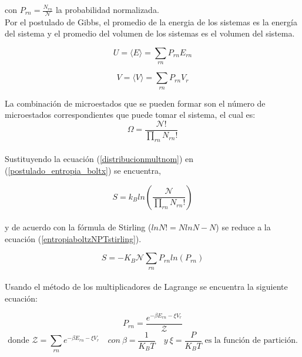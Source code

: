 con $P_{rn} = \frac{N_{rn}}{\mathcal{N}}$ la probabilidad normalizada.\\

Por el postulado de Gibbs, el promedio de la energia de los sistemas es la energía del sistema y el promedio del volumen de los sistemas es el volumen del sistema.

\begin{equation} \label{energiaprobNPT}
    U = \langle E\rangle = \sum_{rn} P_{rn} E_{rn}
\end{equation}

\begin{equation} \label{volprobNPT}
    V = \langle V\rangle = \sum_{rn} P_{rn} V_r
\end{equation}

La combinación de microestados que se pueden formar son el número de microestados correspondientes que puede tomar el sistema, el cual es:\\

\begin{equation} \label{distribucionmultnom}
    \Omega = \frac{\mathcal{N}!}{\prod_{rn} N_{rn}!}
\end{equation}\\

Sustituyendo la ecuación (\ref{distribucionmultnom}) en (\ref{postulado_entropia_boltx}) se encuentra,

\begin{equation}  \label{entropiaboltzNPT}
    S = k_{B}ln\left(\frac{\mathcal{N}}{\prod_{rn} N_{rn}!}\right) 
\end{equation}\\

y de acuerdo con la fórmula de Stirling ($lnN!=NlnN-N$) se reduce a la ecuación (\ref{entropiaboltzNPTstirling}).

\begin{equation}  \label{entropiaboltzNPTstirling}
    S =  -K_{B}\mathcal{N}\sum_{rn} P_{rn} ln(P_{rn})
\end{equation}\\

Usando el método de los multiplicadores de Lagrange se encuentra la siguiente ecuación:

\begin{equation} \label{probNPT}
    P_{rn} = \frac{e^{-\beta E_{rn}-\xi V_r}}{\mathcal{Z}}
\end{equation}
\begin{equation*} \label{funcpartNPT}
    \text{donde }\mathcal{Z} = \sum_{rn} e^{-\beta E_{rn}-\xi V_r} \quad con\ \beta=\frac{1}{K_{B}T} \quad y\ \xi=\frac{P}{K_{B}T}\text{ es la función de partición.}
\end{equation*}

